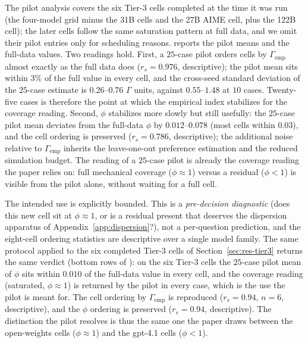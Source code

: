\documentclass[a4paper,fleqn]{cas-sc}
\newcommand{\agreementIndex}{\Gamma}
\begin{document}
The pilot analysis covers the six Tier-3 cells completed at the time it was run (the four-model grid minus the 31B cells and the 27B AIME cell, plus the 122B cell); the later cells follow the same saturation pattern at full data, and we omit their pilot entries only for scheduling reasons.  reports the pilot means and the full-data values. Two
readings hold. First, a $25$-case pilot orders cells by
$\agreementIndex_{\mathrm{emp}}$ almost exactly as the full data does
($r_s=0.976$, descriptive); the pilot mean sits within $3\%$ of the full
value in every cell, and the cross-seed standard deviation of the
$25$-case estimate is $0.26$--$0.76$ $\agreementIndex$ units, against
$0.55$--$1.48$ at $10$ cases. Twenty-five cases is therefore the point
at which the empirical index stabilizes for the coverage reading. Second, $\phi$
stabilizes more slowly but still usefully: the $25$-case pilot mean
deviates from the full-data $\phi$ by $0.012$--$0.078$ (most cells
within $0.03$), and the cell ordering is preserved ($r_s=0.786$,
descriptive); the additional noise relative to $\agreementIndex_{\mathrm{emp}}$
inherits the leave-one-out preference estimation and the reduced
simulation budget. The reading of a $25$-case pilot is already the
coverage reading the paper relies on: full mechanical coverage
($\phi\approx1$) versus a residual ($\phi<1$) is visible from the
pilot alone, without waiting for a full cell.

The intended use is explicitly bounded. This is a
\emph{pre-decision diagnostic} (does this new cell sit at
$\phi\approx1$, or is a residual present that deserves the dispersion
apparatus of Appendix~\ref{app:dispersion}?), not a per-question
prediction, and the eight-cell ordering statistics are descriptive over
a single model family. The same protocol applied to the six completed
Tier-3 cells of Section~\ref{sec:res-tier3} returns the same verdict
(bottom rows of ): on the six Tier-3 cells the
$25$-case pilot mean of $\phi$
sits within $0.010$ of the full-data value in every cell, and the
coverage reading (saturated, $\phi\approx1$) is returned by the
pilot in every case, which is the use the pilot is meant for.
The cell ordering by $\agreementIndex_{\mathrm{emp}}$ is reproduced
($r_s=0.94$, $n=6$, descriptive), and the $\phi$ ordering is
preserved ($r_s=0.94$, descriptive). The distinction the pilot resolves
is thus the same one the paper draws between the open-weights cells
($\phi\approx1$) and the gpt-4.1 cells ($\phi<1$).
\end{document}
